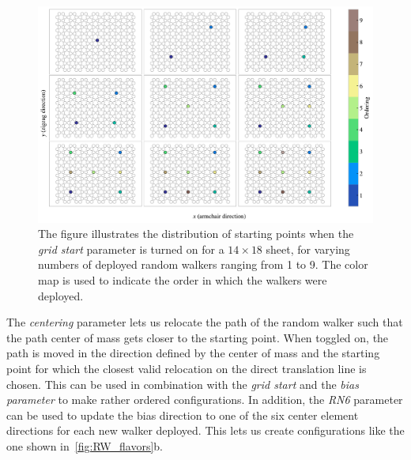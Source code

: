 \begin{figure}[!htb]
  \centering
  \includegraphics[width=0.95\linewidth]{figures/system/grid_start.pdf}
  \caption{The figure illustrates the distribution of starting points when the \textit{grid start} parameter is turned on for a $14\times 18$ sheet, for varying numbers of deployed random walkers ranging from 1 to 9. The color map is used to indicate the order in which the walkers were deployed.}
  \label{fig:grid_start}
\end{figure}

The \textit{centering} parameter lets us relocate the path of the random walker
such that the path center of mass gets closer to the starting point. When
toggled on, the path is moved in the direction defined by the center of mass and
the starting point for which the closest valid relocation on the direct
translation line is chosen. This can be used in combination with the
\textit{grid start} and the \textit{bias parameter} to make rather ordered
configurations. In addition, the \textit{RN6} parameter can be used to update
the bias direction to one of the six center element directions for each new
walker deployed. This lets us create configurations like the one shown
in~\cref{fig:RW_flavors}\textcolor{red!50!black}{b}. 


